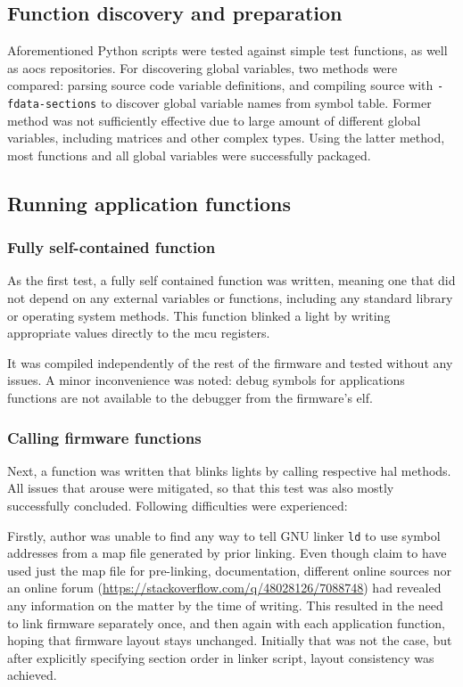 \subsection{Function discovery and preparation}

Aforementioned Python scripts were tested against simple test functions, as well as \gls{aocs} repositories. For discovering global variables, two methods were compared: parsing source code variable definitions, and compiling source with \texttt{-fdata-sections} to discover global variable names from symbol table. Former method was not sufficiently effective due to large amount of different global variables, including matrices and other complex types. Using the latter method, most functions and all global variables were successfully packaged.

\subsection{Running application functions}

\subsubsection{Fully self-contained function}

As the first test, a fully self contained function was written, meaning one that did not depend on any external variables or functions, including any standard library or operating system methods. This function blinked a light by writing appropriate values directly to the \gls{mcu} registers.

It was compiled independently of the rest of the firmware and tested without any issues. A minor inconvenience was noted: debug symbols for applications functions are not available to the debugger from the firmware's \gls{elf}.

\subsubsection{Calling firmware functions}

Next, a function was written that blinks lights by calling respective \gls{hal} methods. All issues that arouse were mitigated, so that this test was also mostly successfully concluded. Following difficulties were experienced:

Firstly, author was unable to find any way to tell GNU linker \texttt{ld} to use symbol addresses from a map file generated by prior linking. Even though \textcite{Dunkels2006} claim to have used just the map file for pre-linking, documentation, different online sources nor an online forum (\url{https://stackoverflow.com/q/48028126/7088748}) had revealed any information on the matter by the time of writing. This resulted in the need to link firmware separately once, and then again with each application function, hoping that firmware layout stays unchanged. Initially that was not the case, but after explicitly specifying section order in linker script, layout consistency was achieved.


